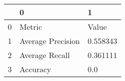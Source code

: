 \begin{tabular}{lll}
\toprule
{} &                  0 &         1 \\
\midrule
0 &             Metric &     Value \\
1 &  Average Precision &  0.558343 \\
2 &     Average Recall &  0.361111 \\
3 &           Accuracy &       0.0 \\
\bottomrule
\end{tabular}

